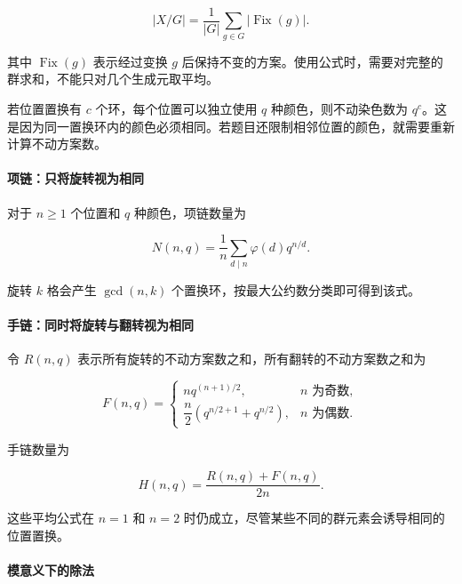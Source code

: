 \[
|X/G|=\frac{1}{|G|}\sum_{g\in G}|\operatorname{Fix}(g)|.
\]

其中 \(\operatorname{Fix}(g)\) 表示经过变换 \(g\) 后保持不变的方案。使用公式时，需要对完整的群求和，不能只对几个生成元取平均。

若位置置换有 \(c\) 个环，每个位置可以独立使用 \(q\) 种颜色，则不动染色数为 \(q^c\)。这是因为同一置换环内的颜色必须相同。若题目还限制相邻位置的颜色，就需要重新计算不动方案数。

\hypertarget{ux9879ux94feux53eaux5c06ux65cbux8f6cux89c6ux4e3aux76f8ux540c}{%
\paragraph{项链：只将旋转视为相同}\label{ux9879ux94feux53eaux5c06ux65cbux8f6cux89c6ux4e3aux76f8ux540c}}

对于 \(n\ge1\) 个位置和 \(q\) 种颜色，项链数量为

\[
N(n,q)=\frac{1}{n}\sum_{d\mid n}\varphi(d)q^{n/d}.
\]

旋转 \(k\) 格会产生 \(\gcd(n,k)\) 个置换环，按最大公约数分类即可得到该式。

\hypertarget{ux624bux94feux540cux65f6ux5c06ux65cbux8f6cux4e0eux7ffbux8f6cux89c6ux4e3aux76f8ux540c}{%
\paragraph{手链：同时将旋转与翻转视为相同}\label{ux624bux94feux540cux65f6ux5c06ux65cbux8f6cux4e0eux7ffbux8f6cux89c6ux4e3aux76f8ux540c}}

令 \(R(n,q)\) 表示所有旋转的不动方案数之和，所有翻转的不动方案数之和为

\[
F(n,q)=
\begin{cases}
 n q^{(n+1)/2}, & n\text{ 为奇数},\\
 \dfrac{n}{2}\left(q^{n/2+1}+q^{n/2}\right), & n\text{ 为偶数}.
\end{cases}
\]

手链数量为

\[
H(n,q)=\frac{R(n,q)+F(n,q)}{2n}.
\]

这些平均公式在 \(n=1\) 和 \(n=2\) 时仍成立，尽管某些不同的群元素会诱导相同的位置置换。

\hypertarget{ux6a21ux610fux4e49ux4e0bux7684ux9664ux6cd5}{%
\paragraph{模意义下的除法}\label{ux6a21ux610fux4e49ux4e0bux7684ux9664ux6cd5}}

